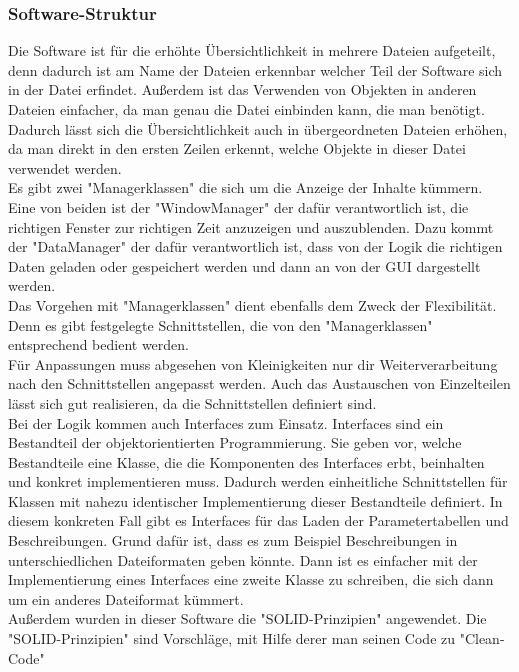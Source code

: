 \documentclass[10pt,a4paper]{article}
\begin{document}
\subsubsection{Software-Struktur}
Die Software ist für die erhöhte Übersichtlichkeit in mehrere Dateien aufgeteilt, denn dadurch ist am Name der Dateien erkennbar welcher Teil der Software sich in der Datei erfindet. Außerdem ist das Verwenden von Objekten in anderen Dateien einfacher, da man genau die Datei einbinden kann, die man benötigt. Dadurch lässt sich die Übersichtlichkeit auch in übergeordneten Dateien erhöhen, da man direkt in den ersten Zeilen erkennt, welche Objekte in dieser Datei verwendet werden.\\
Es gibt zwei "Managerklassen" die sich um die Anzeige der Inhalte kümmern. Eine von beiden ist der "WindowManager" der dafür verantwortlich ist, die richtigen Fenster zur richtigen Zeit anzuzeigen und auszublenden. Dazu kommt der "DataManager" der dafür verantwortlich ist, dass von der Logik die richtigen Daten geladen oder gespeichert werden und dann an von der GUI dargestellt werden. \\
Das Vorgehen mit "Managerklassen" dient ebenfalls dem Zweck der Flexibilität. Denn es gibt festgelegte Schnittstellen, die von den "Managerklassen" entsprechend bedient werden. \\
Für Anpassungen muss abgesehen von Kleinigkeiten nur dir Weiterverarbeitung nach den Schnittstellen angepasst werden. Auch das Austauschen von Einzelteilen lässt sich gut realisieren, da die Schnittstellen definiert sind. \\
Bei der Logik kommen auch Interfaces zum Einsatz. Interfaces sind ein Bestandteil der objektorientierten Programmierung. Sie geben vor, welche Bestandteile eine Klasse, die die Komponenten des Interfaces erbt, beinhalten und konkret implementieren muss. Dadurch werden einheitliche Schnittstellen für Klassen mit nahezu identischer Implementierung dieser Bestandteile definiert.  %
In diesem konkreten Fall gibt es Interfaces für das Laden der Parametertabellen und Beschreibungen. Grund dafür ist, dass es zum Beispiel Beschreibungen in unterschiedlichen Dateiformaten geben könnte. Dann ist es einfacher mit der Implementierung eines Interfaces eine zweite Klasse zu schreiben, die sich dann um ein anderes Dateiformat kümmert.\\
Außerdem wurden in dieser Software die "SOLID-Prinzipien" angewendet. Die "SOLID-Prinzipien" sind Vorschläge, mit Hilfe derer man seinen Code zu "Clean-Code"
\end{document}

